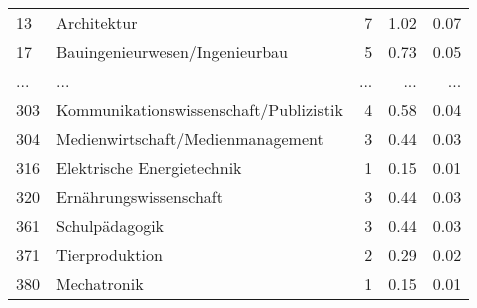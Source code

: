 \begin{longtable}{lXrrr}
        13 & \multicolumn{1}{X}{Architektur} & %
          \num{7} &
          \num[round-mode=places,round-precision=2]{1,02} &
          \num[round-mode=places,round-precision=2]{0,07} \\
        17 & \multicolumn{1}{X}{Bauingenieurwesen/Ingenieurbau} & %
          \num{5} &
          \num[round-mode=places,round-precision=2]{0,73} &
          \num[round-mode=places,round-precision=2]{0,05} \\
       ... & ... & ... & ... & ... \\
        303 & \multicolumn{1}{X}{Kommunikationswissenschaft/Publizistik} & %
          \num{4} &
          \num[round-mode=places,round-precision=2]{0,58} &
          \num[round-mode=places,round-precision=2]{0,04} \\

        304 & \multicolumn{1}{X}{Medienwirtschaft/Medienmanagement} & %
          \num{3} &
          \num[round-mode=places,round-precision=2]{0,44} &
          \num[round-mode=places,round-precision=2]{0,03} \\

        316 & \multicolumn{1}{X}{Elektrische Energietechnik} & %
          \num{1} &
          \num[round-mode=places,round-precision=2]{0,15} &
          \num[round-mode=places,round-precision=2]{0,01} \\

        320 & \multicolumn{1}{X}{Ernährungswissenschaft} & %
          \num{3} &
          \num[round-mode=places,round-precision=2]{0,44} &
          \num[round-mode=places,round-precision=2]{0,03} \\

        361 & \multicolumn{1}{X}{Schulpädagogik} & %
          \num{3} &
          \num[round-mode=places,round-precision=2]{0,44} &
          \num[round-mode=places,round-precision=2]{0,03} \\

        371 & \multicolumn{1}{X}{Tierproduktion} & %
          \num{2} &
          \num[round-mode=places,round-precision=2]{0,29} &
          \num[round-mode=places,round-precision=2]{0,02} \\

        380 & \multicolumn{1}{X}{Mechatronik} & %
          \num{1} &
          \num[round-mode=places,round-precision=2]{0,15} &
          \num[round-mode=places,round-precision=2]{0,01} \\


\end{longtable}
